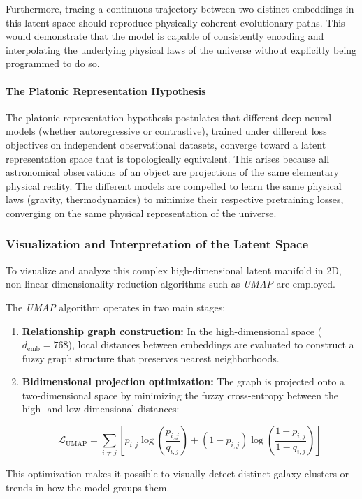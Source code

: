 Furthermore, tracing a continuous trajectory between two distinct embeddings in this latent space should reproduce physically coherent evolutionary paths. This would demonstrate that the model is capable of consistently encoding and interpolating the underlying physical laws of the universe without explicitly being programmed to do so.

\paragraph{The Platonic Representation Hypothesis}
The platonic representation hypothesis \autocites{ar:huh-2024}{ar:duraphe-2025} postulates that different deep neural models (whether autoregressive or contrastive), trained under different loss objectives on independent observational datasets, converge toward a latent representation space that is topologically equivalent. This arises because all astronomical observations of an object are projections of the same elementary physical reality. The different models are compelled to learn the same physical laws (gravity, thermodynamics) to minimize their respective pretraining losses, converging on the same physical representation of the universe.

\subsubsection{Visualization and Interpretation of the Latent Space}
To visualize and analyze this complex high-dimensional latent manifold in 2D, non-linear dimensionality reduction algorithms such as \textit{\gls{UMAP}} \autocite{ar:umap} are employed.

The \textit{\gls{UMAP}} algorithm operates in two main stages:
\begin{enumerate}
\item \textbf{Relationship graph construction:} In the high-dimensional space ($d_{\text{emb}} = 768$), local distances between embeddings are evaluated to construct a fuzzy graph structure that preserves nearest neighborhoods.
\item \textbf{Bidimensional projection optimization:} The graph is projected onto a two-dimensional space by minimizing the fuzzy cross-entropy between the high- and low-dimensional distances:

\begin{equation}
\mathcal{L}_{\text{UMAP}} = \sum_{i \neq j} \left[ p_{i,j} \log \left(\dfrac{p_{i,j}}{q_{i,j}}\right) + \left(1 - p_{i,j}\right) \log \left(\dfrac{1 - p_{i,j}}{1 - q_{i,j}}\right) \right]
\label{eq:umap_loss}
\end{equation}
\end{enumerate}

This optimization makes it possible to visually detect distinct galaxy clusters or trends in how the model groups them.
